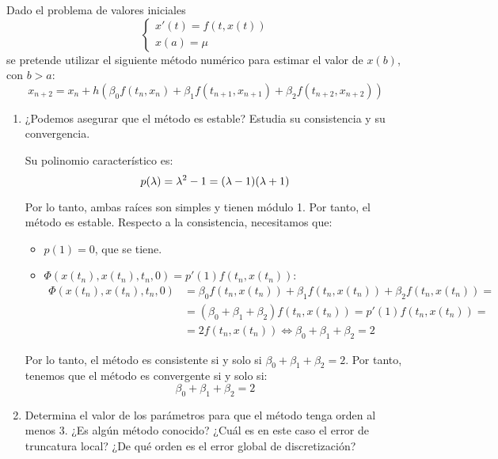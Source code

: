 \begin{ejercicio}
    Dado el problema de valores iniciales
    \begin{equation*}
        \begin{cases}
            x'(t) = f(t, x(t)) \\
            x(a) = \mu
        \end{cases}
    \end{equation*}
    se pretende utilizar el siguiente método numérico para estimar el valor de $x(b)$, con $b > a$:
    \begin{equation*}
        x_{n+2} = x_n + h \left( \beta_0 f(t_n, x_n) + \beta_1 f(t_{n+1}, x_{n+1}) + \beta_2 f(t_{n+2}, x_{n+2}) \right)
    \end{equation*}
    \begin{enumerate}
        \item ¿Podemos asegurar que el método es estable? Estudia su consistencia y su convergencia.
        
        Su polinomio característico es:
        \begin{equation*}
            p(\lambda) = \lambda^2 - 1 = (\lambda - 1)(\lambda + 1)
        \end{equation*}

        Por lo tanto, ambas raíces son simples y tienen módulo 1. Por tanto, el método es estable. Respecto a la consistencia, necesitamos que:
        \begin{itemize}
            \item $p(1) = 0$, que se tiene.
            \item $\Phi(x(t_n), x(t_n), t_n, 0) = p'(1)f(t_n, x(t_n))$:
            \begin{align*}
                \Phi(x(t_n), x(t_n), t_n, 0) &= \beta_0 f(t_n, x(t_n)) + \beta_1 f(t_n, x(t_n)) + \beta_2 f(t_n, x(t_n))
                =\\&= (\beta_0 + \beta_1 + \beta_2)f(t_n, x(t_n)) = p'(1)f(t_n, x(t_n))
                =\\&= 2f(t_n, x(t_n))
                \iff  \beta_0 + \beta_1 + \beta_2 = 2
            \end{align*}
        \end{itemize}
        Por lo tanto, el método es consistente si y solo si $\beta_0 + \beta_1 + \beta_2 = 2$. Por tanto, tenemos que el método es convergente si y solo si:
        \begin{equation*}
            \beta_0 + \beta_1 + \beta_2 = 2
        \end{equation*}
        \item Determina el valor de los parámetros para que el método tenga orden al menos 3. ¿Es algún método conocido? ¿Cuál es en este caso el error de truncatura local? ¿De qué orden es el error global de discretización?
        

\end{enumerate}
\end{ejercicio}
